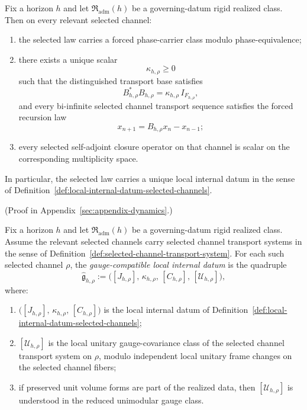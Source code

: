 \begin{theorem}
\label{cor:realized-local-internal-datum-forcing}
Fix a horizon $h$ and let $\mathfrak R_{\mathrm{adm}}(h)$ be a governing-datum
rigid realized class. Then on every relevant selected
channel:
\begin{enumerate}[label=(\roman*), leftmargin=2em, itemsep=0.2em]
\item the selected law carries a forced phase-carrier class modulo
      phase-equivalence;
\item there exists a unique scalar
      \[
      \kappa_{h,\rho}\ge 0
      \]
      such that the distinguished transport base satisfies
      \[
      B_{h,\rho}^*B_{h,\rho}=\kappa_{h,\rho}\,I_{F_{h,\rho}},
      \]
      and every bi-infinite selected channel transport sequence satisfies the
      forced recursion law
      \[
      x_{n+1}=B_{h,\rho}x_n-x_{n-1};
      \]
\item every selected self-adjoint closure operator on that channel is scalar on
      the corresponding multiplicity space.
\end{enumerate}
In particular, the selected law carries a unique local internal datum in the
sense of Definition~\ref{def:local-internal-datum-selected-channels}.
\end{theorem}

(Proof in Appendix~\ref{sec:appendix-dynamics}.)

\begin{definition}
\label{def:gauge-compatible-local-internal-datum}
Fix a horizon $h$ and let $\mathfrak R_{\mathrm{adm}}(h)$ be a governing-datum
rigid realized class. Assume the relevant selected channels carry selected
channel transport systems in the sense of
Definition~\ref{def:selected-channel-transport-system}. For each such selected
channel $\rho$, the \emph{gauge-compatible local internal datum} is the
quadruple
\[
\widehat{\mathfrak g}_{h,\rho}
:=
\bigl([J_{h,\rho}],\,\kappa_{h,\rho},\,[C_{h,\rho}],\,[\mathcal U_{h,\rho}]\bigr),
\]
where:
\begin{enumerate}[label=(\roman*), leftmargin=2em, itemsep=0.2em]
\item $\bigl([J_{h,\rho}],\,\kappa_{h,\rho},\,[C_{h,\rho}]\bigr)$ is the local
      internal datum of Definition~\ref{def:local-internal-datum-selected-channels};
\item $[\mathcal U_{h,\rho}]$ is the local unitary gauge-covariance class of
      the selected channel transport system on $\rho$, modulo independent local
      unitary frame changes on the selected channel fibers;
\item if preserved unit volume forms are part of the realized data, then
      $[\mathcal U_{h,\rho}]$ is understood in the reduced unimodular gauge
      class.
\end{enumerate}
\end{definition}

